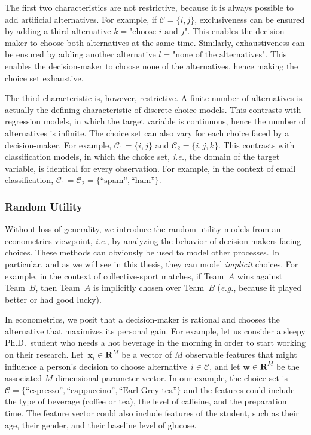 The first two characteristics are not restrictive, because it is always possible to add artificial alternatives.
For example, if $\mathcal{C} = \{i, j\}$, exclusiveness can be ensured by adding a third alternative $k = \text{"choose $i$ and $j$"}$.
This enables the decision-maker to choose both alternatives at the same time.
Similarly, exhaustiveness can be ensured by adding another alternative $l = \text{"none of the alternatives"}$.
This enables the decision-maker to choose none of the alternatives, hence making the choice set exhaustive.

The third characteristic is, however, restrictive.
A finite number of alternatives is actually the defining characteristic of discrete-choice models.
This contrasts with regression models, in which the target variable is continuous, hence the number of alternatives is infinite.
The choice set can also vary for each choice faced by a decision-maker.
For example, $\mathcal{C}_1 = \{ i, j \}$ and $\mathcal{C}_2 = \{ i, j, k \}$.
This contrasts with classification models, in which the choice set, \textit{i.e.}, the domain of the target variable, is identical for every observation.
For example, in the context of email classification, $\mathcal{C}_1 = \mathcal{C}_2 = \{ \text{``spam''}, \text{``ham''} \}$.

\subsubsection{Random Utility}

Without loss of generality, we introduce the random utility models from an econometrics viewpoint, \textit{i.e.}, by analyzing the behavior of decision-makers facing choices.
These methods can obviously be used to model other processes.
In particular, and as we will see in this thesis, they can model \emph{implicit} choices.
For example, in the context of collective-sport matches, if Team~$A$ wins against Team~$B$, then Team~$A$ is implicitly chosen over Team~$B$ (\textit{e.g.}, because it played better or had good lucky).

In econometrics, we posit that a decision-maker is rational and chooses the alternative that maximizes its personal gain.
For example, let us consider a sleepy Ph.D.\ student who needs a hot beverage in the morning in order to start working on their research.
Let~$\bm{x}_i \in \mathbf{R}^M$ be a vector of $M$ observable features that might influence a person's decision to choose alternative~$i \in \mathcal{C}$, and let $\bm{w}\in \mathbf{R}^M$ be the associated $M$-dimensional parameter vector.
In our example, the choice set is $\mathcal{C} = \{ \text{``espresso''}, \text{``cappuccino''}, \text{``Earl Grey tea''}  \}$ and the features could include the type of beverage (coffee or tea), the level of caffeine, and the preparation time.
The feature vector could also include features of the student, such as their age, their gender, and their baseline level of glucose.

